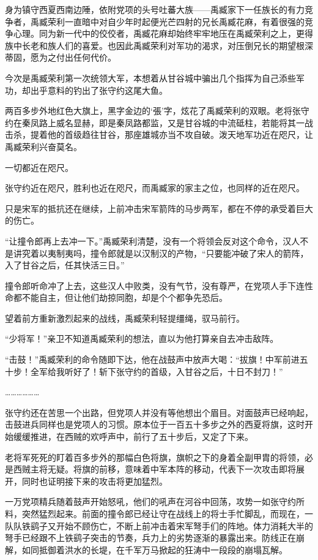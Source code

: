 身为镇守西夏西南边陲，依附党项的头号吐蕃大族——禹臧家下一任族长的有力竞争者，禹臧荣利一直暗中对自少年时起便光芒四射的兄长禹臧花麻，有着很强的竞争心理。同为新一代中的佼佼者，禹臧花麻却始终牢牢地压在禹臧荣利之上，更得族中长老和族人们的喜爱。也因此禹臧荣利对军功的渴求，对压倒兄长的期望根深蒂固，愿为之付出任何代价。

今次是禹臧荣利第一次统领大军，本想着从甘谷城中骗出几个指挥为自己添些军功，却出乎意料的钓出了张守约这尾大鱼。

两百多步外地红色大旗上，黑字金边的‘張’字，炫花了禹臧荣利的双眼。老将张守约在秦凤路上威名显赫，即是秦凤路都监，又是甘谷城的中流砥柱，若能将其一战击杀，提着他的首级趋往甘谷，那座雄城亦当不攻自破。泼天地军功近在咫尺，让禹臧荣利兴奋莫名。

一切都近在咫尺。

张守约近在咫尺，胜利也近在咫尺，而禹臧家的家主之位，也同样的近在咫尺。

只是宋军的抵抗还在继续，上前冲击宋军箭阵的马步两军，都在不停的承受着巨大的伤亡。

“让撞令郎再上去冲一下。”禹臧荣利清楚，没有一个将领会反对这个命令，汉人不是讲究着以夷制夷吗，撞令郎就是以汉制汉的产物，“只要能冲破了宋人的箭阵，入了甘谷之后，任其快活三日。”

撞令郎听命冲了上去，这些汉人中败类，没有气节，没有尊严，在党项人手下连性命都不能自主，但让他们劫掠同胞，却是个个都争先恐后。

望着前方重新激烈起来的战线，禹臧荣利轻提缰绳，驭马前行。

“少将军！”亲卫不知道禹臧荣利的想法，直以为他打算亲自去冲击敌阵。

“击鼓！”禹臧荣利的命令随即下达，他在战鼓声中放声大喝：“拔旗！中军前进五十步！全军给我听好了！斩下张守约的首级，入甘谷之后，十日不封刀！”

………………

张守约还在苦思一个出路，但党项人并没有等他想出个眉目。对面鼓声已经响起，击鼓进兵同样也是党项人的习惯。原本位于一百五十多步之外的西夏将旗，这时开始缓缓推进，在西贼的欢呼声中，前行了五十步后，又定了下来。

老将军死死的盯着百多步外的那幅白色将旗，旗帜之下的身着全副甲胄的将领，必是西贼主将无疑。将旗的前移，意味着中军本阵的移动，代表下一次攻击即将展开，同时也证明接下来的攻击将更加猛烈。

一万党项精兵随着鼓声开始怒吼，他们的吼声在河谷中回荡，攻势一如张守约所料，突然猛烈起来。前面的撞令郎已经让守在战线上的将士手忙脚乱，而现在，一队队铁鹞子又开始不顾伤亡，不断上前冲击着宋军弩手们的阵地。体力消耗大半的弩手已经跟不上铁鹞子突击的节奏，兵力上的劣势逐渐的暴露出来。防线正在崩解，如同抵御着洪水的长堤，在千军万马掀起的狂涛中一段段的崩塌瓦解。


